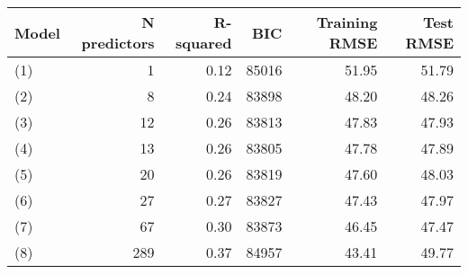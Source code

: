 \begin{tabular}{lrrrrr}
  \toprule
Model & N predictors & R-squared & BIC & Training RMSE & Test RMSE \\ 
  \midrule
(1) & 1 & 0.12 & 85016 & 51.95 & 51.79 \\ 
  (2) & 8 & 0.24 & 83898 & 48.20 & 48.26 \\ 
  (3) & 12 & 0.26 & 83813 & 47.83 & 47.93 \\ 
  (4) & 13 & 0.26 & 83805 & 47.78 & 47.89 \\ 
  (5) & 20 & 0.26 & 83819 & 47.60 & 48.03 \\ 
  (6) & 27 & 0.27 & 83827 & 47.43 & 47.97 \\ 
  (7) & 67 & 0.30 & 83873 & 46.45 & 47.47 \\ 
  (8) & 289 & 0.37 & 84957 & 43.41 & 49.77 \\ 
   \bottomrule
\end{tabular}
